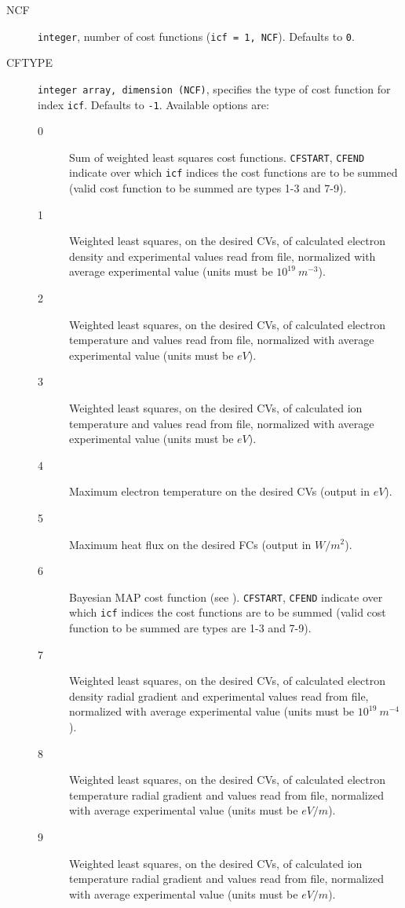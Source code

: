 \begin{description}
  \item[NCF] {\tt integer}, number of cost functions ({\tt icf = 1, NCF}). Defaults to {\tt 0}.
  \item[CFTYPE] {\tt integer array, dimension (NCF)}, specifies the type of cost function for index {\tt icf}. Defaults to {\tt -1}. Available options are:
    \begin{description}
      \item[0] Sum of weighted least squares cost functions. {\tt CFSTART}, {\tt CFEND} indicate over which {\tt icf} indices the cost functions are to be summed (valid cost function to be summed are types 1-3 and 7-9).
      \item[1]  Weighted least squares, on the desired CVs, of calculated electron density and experimental values read from file, normalized with average experimental value  (units must be $10^{19}~m^{-3}$).
      \item[2] Weighted least squares, on the desired CVs, of calculated electron temperature and values read from file, normalized with average experimental value (units must be $eV$).
      \item[3] Weighted least squares, on the desired CVs, of calculated ion temperature and values read from file, normalized with average experimental value (units must be $eV$).
      \item[4] Maximum electron temperature on the desired CVs (output in $eV$).
      \item[5] Maximum heat flux on the desired FCs (output in $W/m^2$).
      \item[6] Bayesian MAP cost function (see \cite{carlpet21}). {\tt CFSTART}, {\tt CFEND} indicate over which {\tt icf} indices the cost functions are to be summed (valid cost function to be summed are types are 1-3 and 7-9).
      \item[7] Weighted least squares, on the desired CVs, of calculated electron density radial gradient and experimental values read from file, normalized with average experimental value (units must be $10^{19}~m^{-4}$).
      \item[8] Weighted least squares, on the desired CVs, of calculated electron temperature radial gradient and values read from file, normalized with average experimental value (units must be $eV/m$).
      \item[9] Weighted least squares, on the desired CVs, of calculated ion temperature radial gradient and values read from file, normalized with average experimental value (units must be $eV/m$).

\end{description}
\end{description}
